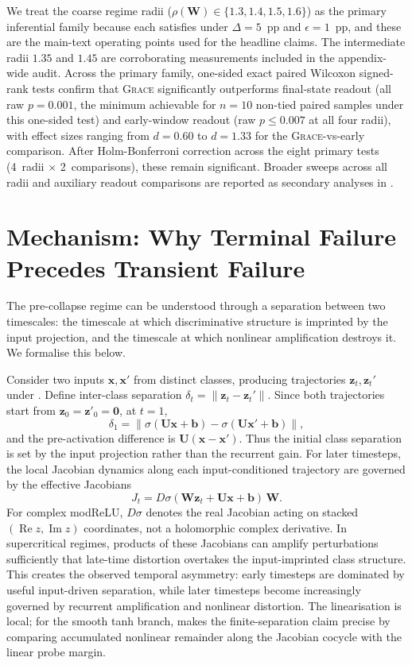 \documentclass{article}
\theoremstyle{remark}
\newcommand{\bz}{\mathbf{z}}
\newcommand{\bx}{\mathbf{x}}
\newcommand{\bW}{\mathbf{W}}
\newcommand{\bU}{\mathbf{U}}
\newcommand{\grace}{\textnormal{\textsc{Grace}}}
\newcommand{\sr}{\rho(\bW)}
\begin{document}
We treat the coarse regime radii ($\sr \in \{1.3, 1.4, 1.5, 1.6\}$) as the
primary inferential family because each satisfies  under
$\Delta = 5$~pp and $\epsilon = 1$~pp, and these are the main-text
operating points used for the headline claims. The intermediate radii
$1.35$ and $1.45$ are corroborating measurements included in the
appendix-wide audit. Across the primary family,
one-sided exact paired Wilcoxon signed-rank tests confirm that \grace{}
significantly outperforms final-state readout (all raw $p = 0.001$, the
minimum achievable for $n = 10$ non-tied paired samples under this one-sided
test) and early-window readout (raw $p \leq 0.007$ at all four radii), with
effect sizes ranging from
$d = 0.60$ to $d = 1.33$ for the \grace{}-vs-early comparison. After
Holm-Bonferroni correction across the eight primary tests (4~radii
$\times$ 2~comparisons), these remain significant. Broader sweeps across
all radii and auxiliary readout comparisons are reported as secondary
analyses in .


\section{Mechanism: Why Terminal Failure Precedes Transient Failure}
\label{sec:mechanism}

The pre-collapse regime can be understood through a separation between two timescales:
the timescale at which discriminative structure is imprinted by the input
projection, and the timescale at which nonlinear amplification destroys it.
We formalise this below.

Consider two inputs $\bx, \bx'$ from distinct classes, producing trajectories
$\bz_t, \bz_t'$ under . Define inter-class separation
$\delta_t = \|\bz_t - \bz_t'\|$. Since both trajectories start from
$\bz_0=\bz'_0=\mathbf{0}$, at $t = 1$,
\[
  \delta_1 =
  \|\sigma(\bU\bx + \mathbf{b}) - \sigma(\bU\bx' + \mathbf{b})\|,
\]
and the pre-activation difference is $\bU(\bx-\bx')$. Thus the initial class
separation is set by the input projection rather than the recurrent gain.
For later timesteps, the local Jacobian dynamics along each input-conditioned
trajectory are governed by the effective Jacobians
\[
  J_t = D\sigma(\bW \bz_t + \bU \bx + \mathbf{b})\,\bW.
\]
For complex modReLU, $D\sigma$ denotes the real Jacobian acting on stacked
$(\operatorname{Re} z,\operatorname{Im} z)$ coordinates, not a holomorphic
complex derivative.
In supercritical regimes, products of these Jacobians can amplify perturbations
sufficiently that late-time distortion overtakes the input-imprinted class
structure. This creates the observed temporal asymmetry: early timesteps are
dominated by useful input-driven separation, while later timesteps become
increasingly governed by recurrent amplification and nonlinear distortion.
The linearisation is local; for the smooth tanh branch,
 makes the finite-separation claim precise by
comparing accumulated nonlinear remainder along the Jacobian cocycle with the
linear probe margin.
\end{document}
